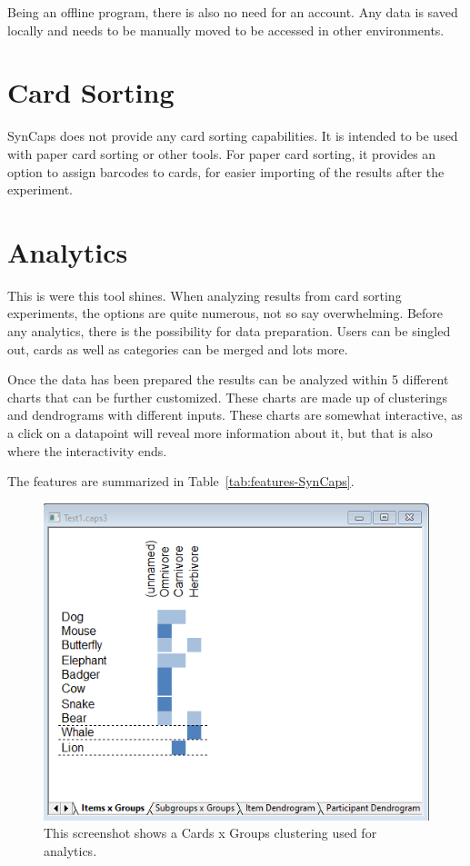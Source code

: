 Being an offline program, there is also no need for an account. Any 
data is saved locally and needs to be manually moved to be accessed in
other environments.

\section{Card Sorting}
SynCaps does not provide any card sorting capabilities. It is intended
to be used with paper card sorting or other tools. For paper card
sorting, it provides an option to assign barcodes to cards, for easier
importing of the results after the experiment.

\section{Analytics}
This is were this tool shines. When analyzing results from card
sorting experiments, the options are quite numerous, not so say
overwhelming. Before any analytics, there is the possibility for
data preparation. Users can be singled out, cards as well as categories
can be merged and lots more.

Once the data has been prepared the results can be analyzed within 5
different charts that can be further customized. These charts are made
up of clusterings and dendrograms with different inputs. These charts
are somewhat interactive, as a click on a datapoint will reveal more
information about it, but that is also where the interactivity ends.

The features are summarized in Table~\ref{tab:features-SynCaps}.

\begin{figure}[tp] 
\centering
\includegraphics[keepaspectratio,width=\linewidth,height=\halfh]{images/syncaps-diagram-1.png}
\caption[SynCaps Clustering] { This screenshot shows a Cards x Groups
clustering used for analytics.
 }
\label{fig:SynCaps2}
\end{figure}

